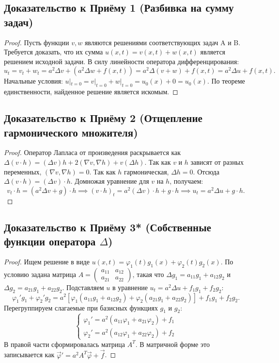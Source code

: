 \subsection*{Доказательство к Приёму 1 (Разбивка на сумму задач)}
\begin{proof}
Пусть функции $v, w$ являются решениями соответствующих задач A и B. Требуется доказать, что их сумма $u(x,t) = v(x,t) + w(x,t)$ является решением исходной задачи. В силу линейности оператора дифференцирования:
\[
u_t = v_t + w_t = a^2\Delta v + (a^2\Delta w + f(x,t)) = a^2\Delta(v+w) + f(x,t) = a^2\Delta u + f(x,t).
\]
Начальные условия: $u|_{t=0} = v|_{t=0} + w|_{t=0} = u_0(x) + 0 = u_0(x)$. По теореме единственности, найденное решение является искомым.
\end{proof}

\subsection*{Доказательство к Приёму 2 (Отщепление гармонического множителя)}
\begin{proof}
Оператор Лапласа от произведения раскрывается как $\Delta(v \cdot h) = (\Delta v)h + 2(\nabla v, \nabla h) + v(\Delta h)$.
Так как $v$ и $h$ зависят от разных переменных, $(\nabla v, \nabla h) = 0$. Так как $h$ гармоническая, $\Delta h = 0$. Отсюда $\Delta(v \cdot h) = (\Delta v) \cdot h$.
Домножая уравнение для $v$ на $h$, получаем:
\[
v_t \cdot h = (a^2\Delta v + g) \cdot h \implies (v \cdot h)_t = a^2(\Delta v) \cdot h + g \cdot h \implies u_t = a^2\Delta u + g \cdot h.
\]
\end{proof}

\subsection*{Доказательство к Приёму 3* (Собственные функции оператора $\Delta$)}
\begin{proof}
Ищем решение в виде $u(x,t) = \varphi_1(t)g_1(x) + \varphi_2(t)g_2(x)$. По условию задана матрица $A = \begin{pmatrix} a_{11} & a_{12} \\ a_{21} & a_{22} \end{pmatrix}$, такая что $\Delta g_1 = a_{11} g_1 + a_{12} g_2$ и $\Delta g_2 = a_{21} g_1 + a_{22} g_2$. Подставляем $u$ в уравнение $u_t = a^2 \Delta u + f_1 g_1 + f_2 g_2$:
\[
\varphi_1' g_1 + \varphi_2' g_2 = a^2 \left[ \varphi_1(a_{11} g_1 + a_{12} g_2) + \varphi_2(a_{21} g_1 + a_{22} g_2) \right] + f_1 g_1 + f_2 g_2.
\]
Перегруппируем слагаемые при базисных функциях $g_1$ и $g_2$:
\[
\begin{cases}
\varphi_1' = a^2(a_{11}\varphi_1 + a_{21}\varphi_2) + f_1 \\
\varphi_2' = a^2(a_{12}\varphi_1 + a_{22}\varphi_2) + f_2
\end{cases}
\]
В правой части сформировалась матрица $A^T$. В матричной форме это записывается как $\vec{\varphi}' = a^2 A^T \vec{\varphi} + \vec{f}$.
\end{proof}

